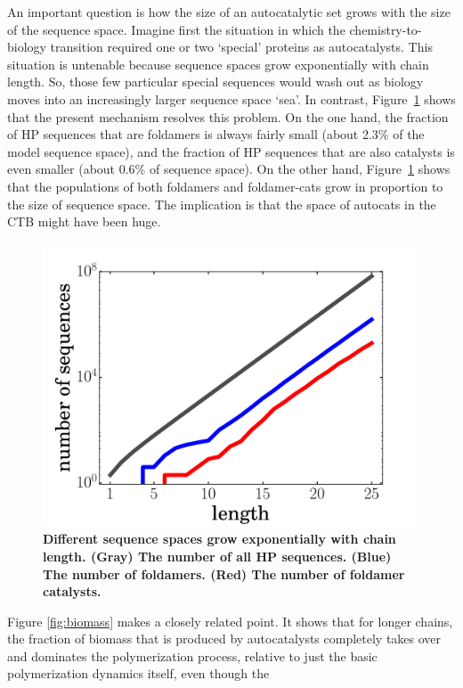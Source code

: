 \documentclass[5p,times]{elsarticle}
\begin{document}
 An important question is how the size of an autocatalytic set grows with the size of the sequence 
space.  Imagine first the situation in which the chemistry-to-biology transition required one or 
two `special' proteins as autocatalysts.  This situation is untenable because sequence spaces grow 
exponentially with chain length.  So, those few particular special sequences would wash out as 
biology moves into an increasingly larger sequence space `sea'.  In contrast, 
Figure~\ref{fig:hp-statistics} shows that the present mechanism resolves this problem.  On the one 
hand, the fraction of HP sequences that are foldamers is always fairly small (about 2.3\% of the 
model sequence space), and the fraction of HP sequences that are also catalysts is even smaller 
(about 0.6\% of sequence space).  On the other hand, Figure~\ref{fig:hp-statistics} shows that the 
populations of both foldamers and foldamer-cats grow in proportion to the size of sequence space.  
The implication is that the space of autocats in the CTB might have been huge.
\begin{figure}[hbt!]
  \centering
  \includegraphics[width=0.9\columnwidth]{pictures/hp-statistics.pdf} 
  \caption{\footnotesize{\bf{Different sequence spaces grow exponentially with chain length.}  
(Gray) The number of all HP sequences.  (Blue) The number of foldamers.  (Red) The number of 
foldamer catalysts.}}
  \label{fig:hp-statistics}
\end{figure}
 Figure \ref{fig:biomass} makes a closely related point.  It shows that for longer chains, the 
fraction of biomass that is produced by autocatalysts completely takes over and dominates the 
polymerization process, relative to just the basic polymerization dynamics itself, even though the 
\end{document}

